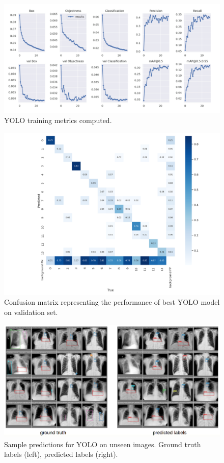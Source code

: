 \documentclass[conference]{IEEEtran}
\begin{document}
\begin{figure}[h]
	\centering
    \includegraphics[width=0.80\linewidth]{yolo_results}
    \caption{YOLO training metrics computed.}
	\label{fig:yolo_results}
\end{figure}

\begin{figure}[h]
	\centering
    \includegraphics[width=0.80\linewidth]{yolo_conf_matrix}
    \caption{Confusion matrix representing the performance of best YOLO model on validation set.}
	\label{fig:yolo_conf_matrix}
\end{figure}

\begin{figure}[h]
	\centering
    \includegraphics[width=0.80\linewidth]{sample_predictions}
    \caption{Sample predictions for YOLO on unseen images. Ground truth labels (left), predicted labels (right).}
	\label{fig:sample_predictions}
\end{figure}
\end{document}
